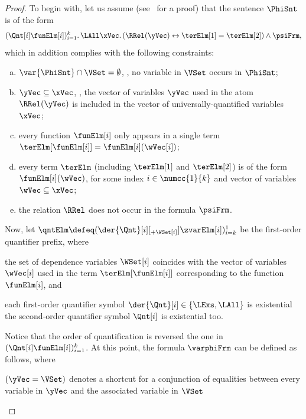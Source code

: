 \documentclass[authoryear]{elsarticle}
\begin{document}
\thmsoladfint*
%
\begin{proof}
  To begin with, let us assume \wlogx (see~\cite{KN09} for a proof) that the
  \SOL sentence $\PhiSnt$ is of the form
  \[
    (\Qnt[i] \funElm[i])_{i = 1}^{k} \ldotp \LAll \xVec \ldotp (\RRel(\yVec)
    \leftrightarrow \terElm[1] = \terElm[2]) \wedge \psiFrm,
  \]
  which in addition complies with the following constraints:
  \begin{enumerate}[a)]
    \item
      $\var{\PhiSnt} \cap \VSet = \emptyset$, \ie, no variable in $\VSet$ occurs
      in $\PhiSnt$;
    \item
      $\yVec \subseteq \xVec$, \ie, the vector of variables $\yVec$ used in the
      atom $\RRel(\yVec)$ is included in the vector of universally-quantified
      variables $\xVec$;
    \item
      every function $\funElm[i]$ only appears in a single term
      $\terElm[{\funElm[i]}] = \funElm[i](\wVec[i])$;
    \item
      every term $\terElm$ (including $\terElm[1]$ and $\terElm[2]$) is of the
      form $\funElm[i](\wVec)$, for some index $i \in \numcc{1}{k}$ and vector
      of variables $\wVec \subseteq \xVec$;
    \item
      the relation $\RRel$ does not occur in the \FOL formula $\psiFrm$.
  \end{enumerate}
  Now, let $\qntElm \defeq (\der{\Qnt}[i][_{+\WSet[i]}] \zvarElm[i])_{i =
  k}^{1}$ be the first-order quantifier prefix, where
  \begin{inparaenum}[(i)]
    \item
      the set of dependence variables $\WSet[i]$ coincides with the vector of
      variables $\wVec[i]$ used in the term $\terElm[{\funElm[i]}]$
      corresponding to the function $\funElm[i]$, and
    \item
      each first-order quantifier symbol $\der{\Qnt}[i] \in \{ \LExs, \LAll \}$
      is existential \iff the second-order quantifier symbol $\Qnt[i]$ is
      existential too.
  \end{inparaenum}
  Notice that the order of quantification is reversed \wrt the one in $(\Qnt[i]
  \funElm[i])_{i = 1}^{k}$.
  At this point, the \ADF formula $\varphiFrm$ can be defined as follows, where
  \begin{inparaenum}[(1)]
    \item
      $(\yVec = \VSet)$ denotes a shortcut for a conjunction of equalities
      between every variable in $\yVec$ and the associated variable in $\VSet$

\end{inparaenum}
\end{proof}
\end{document}
